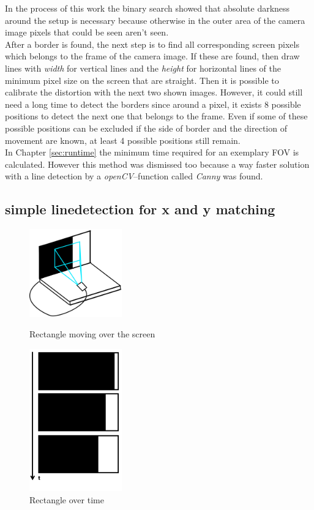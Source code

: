 \documentclass[journal,final,a4paper,twoside]{PS}
\begin{document}
In the process of this work the binary search showed that absolute darkness around the setup is necessary because otherwise in the outer area of the camera image pixels that could be seen aren't seen. \\
After a border is found, the next step is to find all corresponding screen pixels which belongs to the frame of the camera image. If these are found, then draw lines with \emph{width} for vertical lines and the \emph{height} for horizontal lines of the minimum pixel size on the screen that are straight. Then it is possible  to calibrate the distortion with the next two shown images. However, it could still need a long time to detect the borders since around a pixel, it exists 8 possible positions to detect the next one that belongs to the frame. Even if some of these possible positions can be excluded if the side of border and the direction of movement are known, at least 4 possible positions still remain. \\%
In Chapter \ref{sec:runtime} the minimum time required for an exemplary FOV is calculated. However this method was dismissed too because a way faster solution with a line detection by a \emph{openCV}--function called \emph{Canny} was found. 

\subsection{simple linedetection for x and y matching}

\begin{figure}
\centering
\parbox{4cm}{
\includegraphics[width=4cm]{./pics/rect.png}
\caption{Rectangle moving over the screen}
\label{fig:setup}}
\qquad
\begin{minipage}{4cm}
\includegraphics[width=4cm]{./pics/pattern.png}
\caption{Rectangle over time}
\label{fig:blockOverTime}
\end{minipage}
\end{figure}
\end{document}
